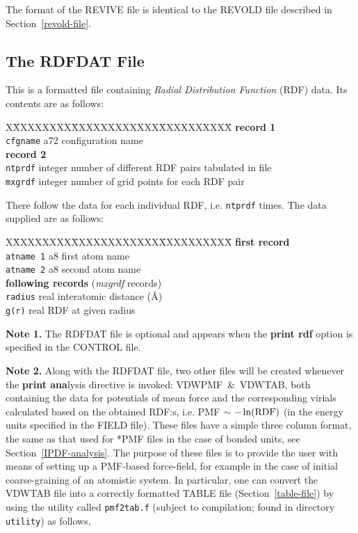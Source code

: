 The format of the REVIVE file is identical to the REVOLD file
described in Section~\ref{revold-file}.

\subsection{The RDFDAT File}
\label{rdf-file}

This is a formatted file containing {\em Radial Distribution
Function} (RDF) data.  Its contents are as follows:
\begin{tabbing}
X\=XXXXXXXX\=XXXXXXXXXXXX\=XXXXXXXXXX\=\kill
{\bf record 1} \\
\> {\tt cfgname} \> a72     \> configuration name \\
{\bf record 2} \\
\> {\tt ntprdf}  \> integer \> number of different RDF pairs tabulated in file \\
\> {\tt mxgrdf}  \> integer \> number of grid points for each RDF pair
\end{tabbing}
There follow the data for each individual RDF, i.e. {\tt ntprdf}
times.  The data supplied are as follows:
\begin{tabbing}
X\=XXXXXXXX\=XXXXXXXXXXXX\=XXXXXXXXXX\=\kill
{\bf first record} \\
\> {\tt atname 1} \> a8   \> first atom name \\
\> {\tt atname 2} \> a8   \> second atom name \\
{\bf following records} ({\em mxgrdf} records) \\
\> {\tt radius}   \> real \> interatomic distance (\AA) \\
\> {\tt g(r)}     \> real \> RDF at given radius
\end{tabbing}

{\bf Note 1.} The RDFDAT file is optional and appears when the
{\bf print rdf} option is specified in the CONTROL file.

{\bf Note 2.} Along with the RDFDAT file, two other files will
be created whenever the {\bf print ana}lysis directive is invoked:
VDWPMF~\&~VDWTAB, both containing the data for potentials of mean
force and the corresponding virials calculated based on the obtained
RDF:s, i.e. PMF $\sim -\ln({\rm RDF})$ (in the energy units specified
in the FIELD file).  These files have a simple three column format,
the same as that used for *PMF files in the case of bonded units,
see Section~\ref{IPDF-analysis}.  The purpose of these files is to
provide the user with means of setting up a PMF-based force-field,
for example in the case of initial coarse-graining of
an atomistic system.  In particular, one can convert the VDWTAB file
into a correctly formatted TABLE file (Section~\ref{table-file})
by using the utility called {\tt pmf2tab.f} (subject to compilation;
found in \D directory {\tt utility}) as follows,

